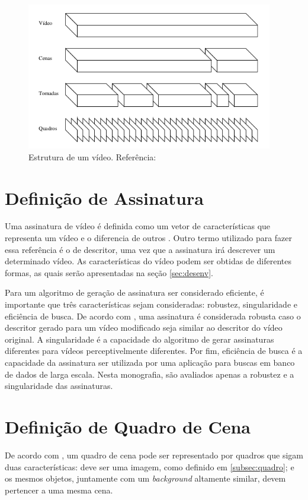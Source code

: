 	\begin{figure}[H]
        \centering
        \includegraphics[width=0.96\textwidth]{dados/figuras/video.png}
        \caption{Estrutura de um vídeo. Referência: \citeauthor{santos2004segmentaccao}}
    	\label{fig:video}
    \end{figure}

  	\section{Definição de Assinatura}
    \label{sec:signature}
    
    	Uma assinatura de vídeo é definida como um vetor de características que representa um vídeo e o diferencia de outros \citeauthor{lee2008robust}. Outro termo utilizado para fazer essa referência é o de descritor, uma vez que a assinatura irá descrever um determinado vídeo. As características do vídeo podem ser obtidas de diferentes formas, as quais serão apresentadas na seção \ref{sec:desenv}.
        
       Para um algoritmo de geração de assinatura ser considerado eficiente, é importante que três características sejam consideradas: robustez, singularidade e eficiência de busca. De acordo com \citeauthor{lee2008robust}, uma assinatura é considerada robusta caso o descritor gerado para um vídeo modificado seja similar ao descritor do vídeo original. A singularidade é a capacidade do algoritmo de gerar assinaturas diferentes para vídeos perceptivelmente diferentes. Por fim, eficiência de busca é a capacidade da assinatura  ser utilizada por uma aplicação para buscas em banco de dados de larga escala. Nesta monografia, são avaliados apenas a robustez e a singularidade das assinaturas.
       
       \section{Definição de Quadro de Cena}
       \label{sec:quadrocena}
       De acordo com \citeauthor{mao2015sceneframe}, um quadro de cena pode ser representado por quadros que sigam duas características: deve ser uma imagem, como definido em \ref{subsec:quadro}; e os mesmos objetos, juntamente com um \textit{background} altamente similar, devem pertencer a uma mesma cena.
       
